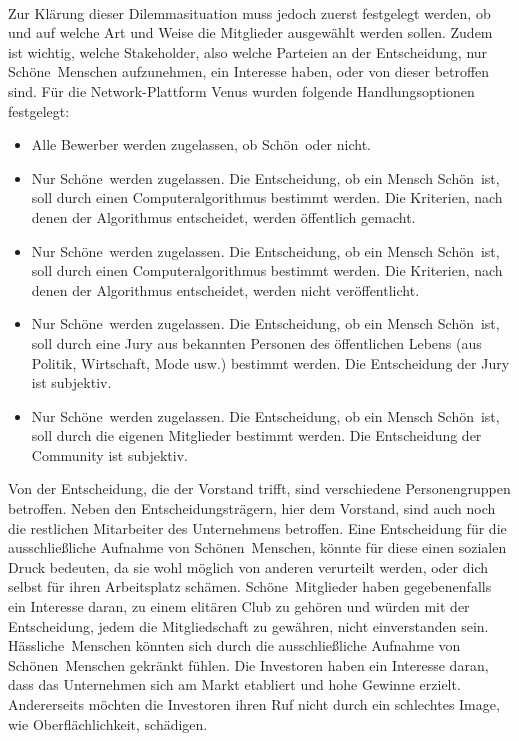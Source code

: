 \\ 
Zur Klärung dieser Dilemmasituation muss jedoch zuerst festgelegt werden, ob und auf welche Art und Weise die Mitglieder ausgewählt werden sollen. Zudem ist wichtig, welche Stakeholder, also welche Parteien an der Entscheidung, nur \glqq Schöne\grqq~Menschen aufzunehmen, ein Interesse haben, oder von dieser betroffen sind. Für die Network-Plattform Venus wurden folgende Handlungsoptionen festgelegt:
\begin{itemize}
\item Alle Bewerber werden zugelassen, ob \glqq Schön\grqq~oder nicht.
\item Nur \glqq Schöne\grqq~werden zugelassen. Die Entscheidung, ob ein Mensch \glqq Schön\grqq~ist, soll durch einen Computeralgorithmus bestimmt werden. Die Kriterien, nach denen der Algorithmus entscheidet, werden öffentlich gemacht.
\item Nur \glqq Schöne\grqq~werden zugelassen. Die Entscheidung, ob ein Mensch \glqq Schön\grqq~ist, soll durch einen Computeralgorithmus bestimmt werden. Die Kriterien, nach denen der Algorithmus entscheidet, werden nicht veröffentlicht.
\item Nur \glqq Schöne\grqq~werden zugelassen. Die Entscheidung, ob ein Mensch \glqq Schön\grqq~ist, soll durch eine Jury aus bekannten Personen des öffentlichen Lebens (aus Politik, Wirtschaft, Mode usw.) bestimmt werden. Die Entscheidung der Jury ist subjektiv.
\item Nur \glqq Schöne\grqq~werden zugelassen. Die Entscheidung, ob ein Mensch \glqq Schön\grqq~ist, soll durch die eigenen Mitglieder bestimmt werden. Die Entscheidung der Community ist subjektiv.
\end{itemize}
Von der Entscheidung, die der Vorstand trifft, sind verschiedene Personengruppen betroffen. Neben den Entscheidungsträgern, hier dem Vorstand, sind auch noch die restlichen Mitarbeiter des Unternehmens betroffen. Eine Entscheidung für die ausschließliche Aufnahme von \glqq Schönen\grqq~Menschen, könnte für diese einen sozialen Druck bedeuten, da sie wohl möglich von anderen verurteilt werden, oder dich selbst für ihren Arbeitsplatz schämen. \glqq Schöne\grqq~Mitglieder haben gegebenenfalls ein Interesse daran, zu einem elitären Club zu gehören und würden mit der Entscheidung, jedem die Mitgliedschaft zu gewähren, nicht einverstanden sein. \glqq Hässliche\grqq~Menschen könnten sich durch die ausschließliche Aufnahme von \glqq Schönen\grqq~Menschen gekränkt fühlen. Die Investoren haben ein Interesse daran, dass das Unternehmen sich am Markt etabliert und hohe Gewinne erzielt. Andererseits möchten die Investoren ihren Ruf nicht durch ein schlechtes Image, wie \glqq Oberflächlichkeit\grqq, schädigen.

